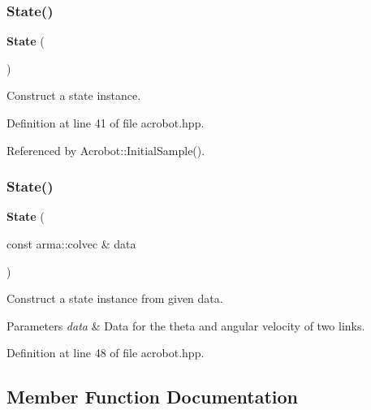 \subsubsection{State()\hspace{0.1cm}{\footnotesize\ttfamily [1/2]}}
{\footnotesize\ttfamily \textbf{ State} (\begin{DoxyParamCaption}{ }\end{DoxyParamCaption})\hspace{0.3cm}{\ttfamily [inline]}}



Construct a state instance. 



Definition at line 41 of file acrobot.\+hpp.



Referenced by Acrobot\+::\+Initial\+Sample().

\mbox{\label{classmlpack_1_1rl_1_1Acrobot_1_1State_a8bc7967f6d91a3c94f9b3f502297a926}} 
\subsubsection{State()\hspace{0.1cm}{\footnotesize\ttfamily [2/2]}}
{\footnotesize\ttfamily \textbf{ State} (\begin{DoxyParamCaption}\item[{const arma\+::colvec \&}]{data }\end{DoxyParamCaption})\hspace{0.3cm}{\ttfamily [inline]}}



Construct a state instance from given data. 


\begin{DoxyParams}{Parameters}
{\em data} & Data for the theta and angular velocity of two links. \\
\hline
\end{DoxyParams}


Definition at line 48 of file acrobot.\+hpp.



\subsection{Member Function Documentation}
\mbox{\label{classmlpack_1_1rl_1_1Acrobot_1_1State_ac10567562fe926ea105ce91a5bbc81c8}} 
